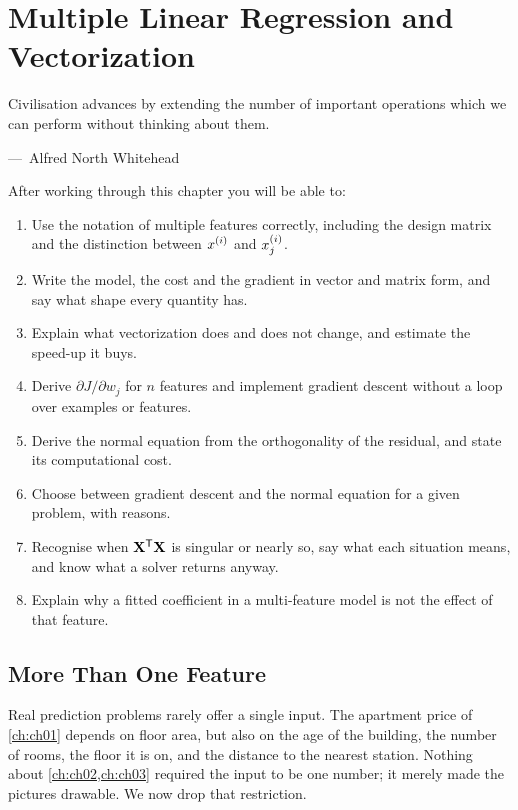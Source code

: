 
\chapter{Multiple Linear Regression and Vectorization}
\label{ch:ch04}

\epigraph{Civilisation advances by extending the number of important operations
which we can perform without thinking about them.}%
{---\ Alfred North Whitehead}

\begin{chapterlearning}
After working through this chapter you will be able to:
\begin{enumerate}
  \item Use the notation of multiple features correctly, including the design
        matrix and the distinction between $x^{(i)}$ and $x^{(i)}_{j}$.
  \item Write the model, the cost and the gradient in vector and matrix form,
        and say what shape every quantity has.
  \item Explain what vectorization does and does not change, and estimate the
        speed-up it buys.
  \item Derive $\partial J/\partial w_j$ for $n$ features and implement gradient
        descent without a loop over examples or features.
  \item Derive the normal equation from the orthogonality of the residual, and
        state its computational cost.
  \item Choose between gradient descent and the normal equation for a given
        problem, with reasons.
  \item Recognise when $\mathbf{X}^{\mathsf{T}}\mathbf{X}$ is singular or nearly so, say
        what each situation means, and know what a solver returns anyway.
  \item Explain why a fitted coefficient in a multi-feature model is not the
        effect of that feature.
\end{enumerate}
\end{chapterlearning}

\section{More Than One Feature}
\label{sec:more-features}

Real prediction problems rarely offer a single input. The apartment price of
\cref{ch:ch01} depends on floor area, but also on the age of the building, the
number of rooms, the floor it is on, and the distance to the nearest station.
Nothing about \cref{ch:ch02,ch:ch03} required the input to be one number; it
merely made the pictures drawable. We now drop that restriction.

